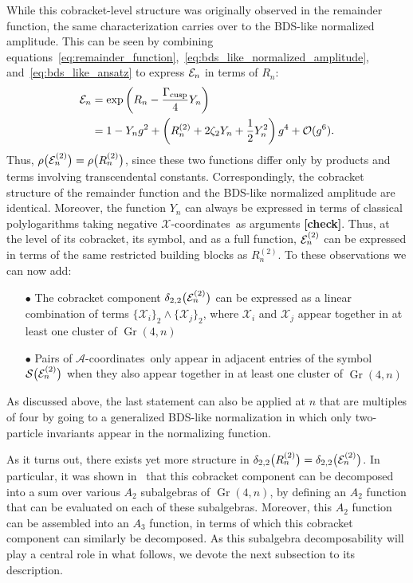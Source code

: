 \documentclass[11pt]{article}
\DeclareMathOperator{\Gr}{Gr}
\def\x{\mathcal{X}}
\def\xcoords{$\mathcal{X}$-coordinates}
\def\acoords{$\mathcal{A}$-coordinates}
\def\draftnote#1{{\bf [#1]}}
\begin{document}
While this cobracket-level structure was originally observed in the remainder function, the same characterization carries over to the BDS-like normalized amplitude. This can be seen by combining equations~\eqref{eq:remainder_function},~\eqref{eq:bds_like_normalized_amplitude}, and~\eqref{eq:bds_like_ansatz} to express ${\cal E}_n$ in terms of $R_n$:
\begin{align}
{\cal E}_n &= \exp \left(R_n- \frac{\Gamma_{\text{cusp}}}{4} Y_n \right) \\
&= 1 - Y_n g^2 + \left(R_n^{(2)} + 2 \zeta_2 Y_n + \frac{1}{2} Y_n^2 \right) g^4 + \mathcal{O}(g^6). \nonumber
\end{align} 
Thus, $\rho \big({\cal E}_n^{(2)}\big) = \rho \big(R_n^{(2)} \big)$, since these two functions differ only by products and terms involving transcendental constants. Correspondingly, the cobracket structure of the remainder function and the BDS-like normalized amplitude are identical. Moreover, the function $Y_n$ can always be expressed in terms of classical polylogarithms taking negative \xcoords\ as arguments \draftnote{check}. Thus, at the level of its cobracket, its symbol, and as a full function, ${\cal E}^{(2)}_n$ can be expressed in terms of the same restricted building blocks as $R^{(2)}_n$. To these observations we can now add:
\begin{itemize}
\item[$\bullet$] The cobracket component $\delta_{2,2}\big({\cal E}^{(2)}_n\big)$ can be expressed as a linear combination of terms $\{ \x_i \}_2 \wedge \{ \x_j \}_2$, where $\x_i$ and $\x_j$ appear together in at least one cluster of $\Gr(4,n)$
\item[$\bullet$] Pairs of \acoords\ only appear in adjacent entries of the symbol ${\cal S} \big({\cal E}^{(2)}_n\big)$ when they also appear together in at least one cluster of $\Gr(4,n)$
\end{itemize}
As discussed above, the last statement can also be applied at $n$ that are multiples of four by going to a generalized BDS-like normalization in which only two-particle invariants appear in the normalizing function.

As it turns out, there exists yet more structure in $\delta_{2,2}\big(R^{(2)}_n\big) = \delta_{2,2}\big({\cal E}^{(2)}_n\big)$. In particular, it was shown in~\cite{Golden:2014xqa} that this cobracket component can be decomposed into a sum over various $A_2$ subalgebras of $\Gr(4,n)$, by defining an $A_2$ function that can be evaluated on each of these subalgebras. Moreover, this $A_2$ function can be assembled into an $A_3$ function, in terms of which this cobracket component can similarly be decomposed. As this subalgebra decomposability will play a central role in what follows, we devote the next subsection to its description.
\end{document}
